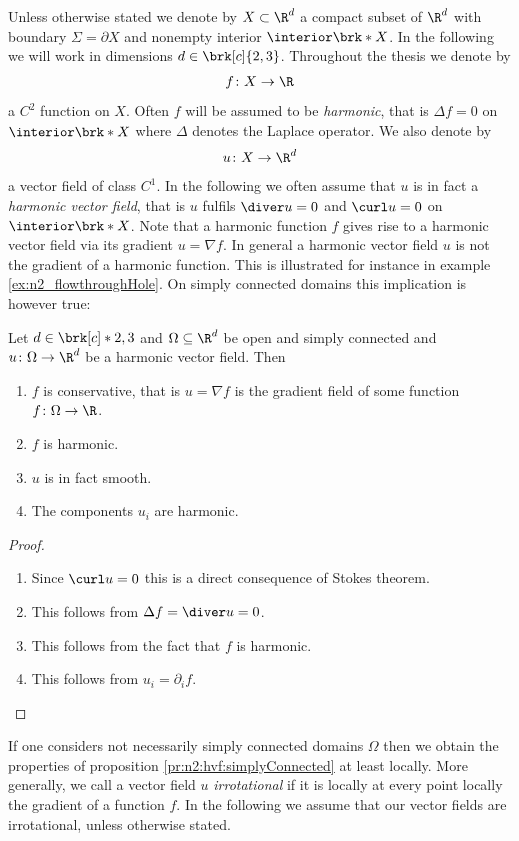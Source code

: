 Unless otherwise stated we denote by $X\subset\R^d$ a compact subset of $\R^d$ with boundary $\Sigma=\partial X$ and nonempty interior
$\openX$.
In the following we will work in dimensions $d\in\brk[c]{2,3}$.
Throughout the thesis we denote by
\begin{align*}
  f\colon X\to\R
\end{align*}
a $C^2$ function on $X$. Often $f$ will be assumed to be \emph{harmonic},
that is $\Delta f=0$ on $\openX$ where $\Delta$ denotes the Laplace operator.
We also denote by
\begin{align*}
  u\colon X\to\R^d
\end{align*}
a vector field of class $C^1$.
In the following we often assume that $u$ is in fact a \emph{harmonic vector field}, that is $u$ fulfils
$\diver u=0$ and $\curl u=0$ on $\openX$.
Note that a harmonic function $f$ gives rise to a harmonic vector field via its gradient $u=\nabla f$.
In general a harmonic vector field $u$ is not the gradient of a harmonic function.
This is illustrated for instance in example \ref{ex:n2_flowthroughHole}.
On simply connected domains this implication is however true:
\begin{proposition}\label{pr:n2:hvf:simplyConnected}
  Let $d\in\brk[c]*{2,3}$ and $\Omega\subseteq\R^d$ be open and simply connected and $u\colon\Omega\to\R^d$ be a harmonic vector field. Then
  \begin{enumerate}
    \item $f$ is conservative, that is
    $u=\nabla f$ is the gradient field of some
    function $f\colon\Omega\to\R$.
    \item $f$ is harmonic.
    \item $u$ is in fact smooth.
    \item The components $u_i$ are harmonic.
  \end{enumerate}
\end{proposition}
\begin{proof}
  \begin{enumerate}
    \item 
    Since $\curl u =0$ this is a direct consequence of Stokes theorem.
    \item This follows from $\Delta f = \diver u=0$.
    \item This follows from the fact that $f$ is harmonic.
    \item This follows from $u_i=\partial_if$.\qedhere
  \end{enumerate}
\end{proof}
If one considers not necessarily simply connected domains $\Omega$ then we obtain the
properties of proposition \ref{pr:n2:hvf:simplyConnected} at least locally.
More generally, we call a vector field $u$ \emph{irrotational} if it is locally at every point locally the gradient of a function $f$.
In the following we assume that our vector fields are irrotational, unless otherwise stated.


